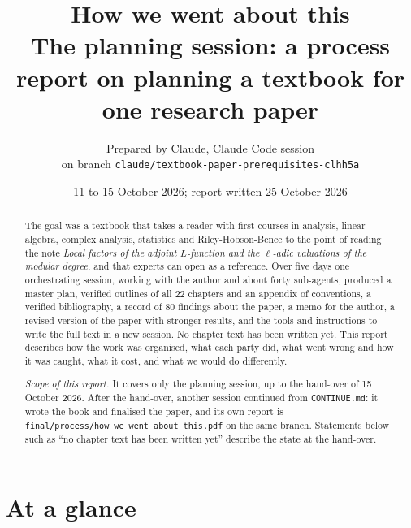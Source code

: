 \documentclass[11pt]{article}
\title{How we went about this\\[0.5ex]\large The planning session: a process report on planning a textbook for one research paper}
\author{Prepared by Claude, Claude Code session\\ on branch \texttt{claude/textbook-paper-prerequisites-clhh5a}}
\date{11 to 15 October 2026; report written 25 October 2026}
\begin{document}
\maketitle

\begin{abstract}
The goal was a textbook that takes a reader with first courses in analysis, linear algebra, complex analysis,
statistics and Riley-Hobson-Bence to the point of reading the note \emph{Local factors of the adjoint
$L$-function and the $\ell$-adic valuations of the modular degree}, and that experts can open as a reference.
Over five days one orchestrating session, working with the author and about forty sub-agents, produced a master
plan, verified outlines of all 22 chapters and an appendix of conventions, a verified bibliography, a record of
80 findings about the paper, a memo for the author, a revised version of the paper with stronger results, and
the tools and instructions to write the full text in a new session. No chapter text has been written yet. This
report describes how the work was organised, what each party did, what went wrong and how it was caught, what it
cost, and what we would do differently.

\emph{Scope of this report.} It covers only the planning session, up to the hand-over of 15 October 2026. After the hand-over, another session continued from \texttt{CONTINUE.md}: it wrote the book and finalised the paper, and its own report is \texttt{final/process/how\_we\_went\_about\_this.pdf} on the same branch. Statements below such as ``no chapter text has been written yet'' describe the state at the hand-over.
\end{abstract}

\section{At a glance}
\end{document}
